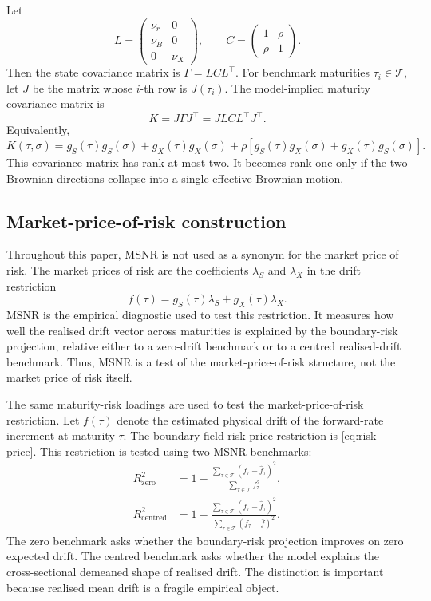\documentclass[11pt]{article}
\newcommand{\Rzero}{R^2_{\mathrm{zero}}}
\newcommand{\Rcent}{R^2_{\mathrm{centred}}}
\newcommand{\Tset}{\mathcal{T}}
\begin{document}
Let
\begin{equation}
  L=\begin{pmatrix}
    \nu_r & 0\\
    \nu_B & 0\\
    0 & \nu_X
  \end{pmatrix},
  \qquad
  C=\begin{pmatrix}
    1 & \rho\\
    \rho & 1
  \end{pmatrix}.
\end{equation}
Then the state covariance matrix is $\Gamma=LCL^\top$. For benchmark maturities $\tau_i\in\Tset$, let $J$ be the matrix whose $i$-th row is $J(\tau_i)$. The model-implied maturity covariance matrix is
\begin{equation}
  K=J\Gamma J^\top = JLC L^\top J^\top.
\end{equation}
Equivalently,
\begin{equation}
  K(\tau,\sigma)
  = g_S(\tau)g_S(\sigma)+g_X(\tau)g_X(\sigma)
  +\rho\left[g_S(\tau)g_X(\sigma)+g_X(\tau)g_S(\sigma)\right].
  \label{eq:kernel}
\end{equation}
This covariance matrix has rank at most two. It becomes rank one only if the two Brownian directions collapse into a single effective Brownian motion.

\subsection{Market-price-of-risk construction}

Throughout this paper, MSNR is not used as a synonym for the market price of risk. The market prices of risk are the coefficients $\lambda_S$ and $\lambda_X$ in the drift restriction
\begin{equation}
  f(\tau)=g_S(\tau)\lambda_S+g_X(\tau)\lambda_X.
\end{equation}
MSNR is the empirical diagnostic used to test this restriction. It measures how well the realised drift vector across maturities is explained by the boundary-risk projection, relative either to a zero-drift benchmark or to a centred realised-drift benchmark. Thus, MSNR is a test of the market-price-of-risk structure, not the market price of risk itself.

The same maturity-risk loadings are used to test the market-price-of-risk restriction. Let $f(\tau)$ denote the estimated physical drift of the forward-rate increment at maturity $\tau$. The boundary-field risk-price restriction is \cref{eq:risk-price}. This restriction is tested using two MSNR benchmarks:
\begin{align}
  \Rzero
  &= 1-\frac{\sum_{\tau\in\Tset}(f_\tau-\hat f_\tau)^2}{\sum_{\tau\in\Tset} f_\tau^2}, \label{eq:Rzero}\\
  \Rcent
  &= 1-\frac{\sum_{\tau\in\Tset}(f_\tau-\hat f_\tau)^2}{\sum_{\tau\in\Tset}(f_\tau-\bar f)^2}. \label{eq:Rcent}
\end{align}
The zero benchmark asks whether the boundary-risk projection improves on zero expected drift. The centred benchmark asks whether the model explains the cross-sectional demeaned shape of realised drift. The distinction is important because realised mean drift is a fragile empirical object.
\end{document}
